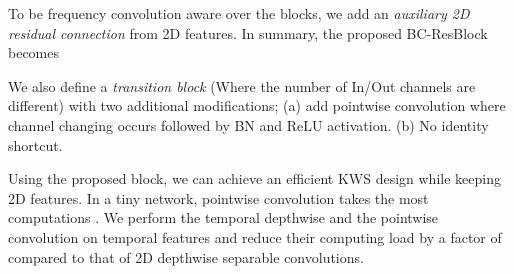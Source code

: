 \documentclass[a4paper]{article}
\begin{document}
\begin{table}[t]
    \caption{\textbf{BC-ResNet-1.} Each row is a sequence of one or more identical modules repeated  times with input shape of channelfrequencytime, total time steps , and the number of output channels . Changes in number of channels and downsampling by stride  belong to the first block of each sequence of BC-ResBlocks. The temporal convolutions in all BC-ResBlocks use dilation of .}
    \label{bc-resnet-0_structure}
\centering
\vskip -0.1in
\end{table}

To be frequency convolution aware over the blocks, we add an \textit{auxiliary 2D residual connection} from 2D features. In summary, the proposed BC-ResBlock becomes

We also define a \textit{transition block} (Where the number of In/Out channels are different) with two additional modifications; (a) add pointwise convolution where channel changing occurs followed by BN and ReLU activation. (b) No identity shortcut.

Using the proposed block, we can achieve an efficient KWS design while keeping 2D features. In a tiny network, pointwise convolution takes the most computations \cite{shufflenet}. We perform the temporal depthwise and the pointwise convolution on temporal features and reduce their computing load by a factor of  compared to that of 2D depthwise separable convolutions.
\end{document}
